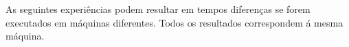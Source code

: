 As seguintes experiências podem resultar em tempos diferenças se forem executados em máquinas diferentes. Todos os resultados correspondem á mesma máquina.


